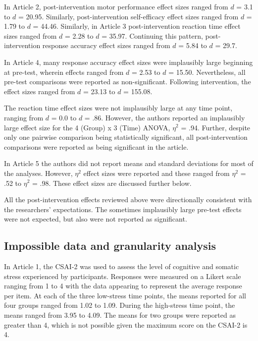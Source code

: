 \documentclass[
  english,
  man,floatsintext]{apa7}
\begin{document}
In Article 2, post-intervention motor performance effect sizes ranged from \(d\) = 3.1 to \(d\) = 20.95. Similarly, post-intervention self-efficacy effect sizes ranged from \(d\) = 1.79 to \(d\) = 44.46. Similarly, in Article 3 post-intervention reaction time effect sizes ranged from \(d\) = 2.28 to \(d\) = 35.97. Continuing this pattern, post-intervention response accuracy effect sizes ranged from \(d\) = 5.84 to \(d\) = 29.7.

In Article 4, many response accuracy effect sizes were implausibly large beginning at pre-test, wherein effects ranged from \(d\) = 2.53 to \(d\) = 15.50. Nevertheless, all pre-test comparisons were reported as non-significant. Following intervention, the effect sizes ranged from \(d\) = 23.13 to \(d\) = 155.08.

The reaction time effect sizes were not implausibly large at any time point, ranging from \(d\) = 0.0 to \(d\) = .86. However, the authors reported an implausibly large effect size for the 4 (Group) x 3 (Time) ANOVA, \(\eta^{2}\) = .94. Further, despite only one pairwise comparison being statistically significant, all post-intervention comparisons were reported as being significant in the article.

In Article 5 the authors did not report means and standard deviations for most of the analyses. However, \(\eta^{2}\) effect sizes were reported and these ranged from \(\eta^{2}\) = .52 to \(\eta^{2}\) = .98. These effect sizes are discussed further below.

All the post-intervention effects reviewed above were directionally consistent with the researchers' expectations. The sometimes implausibly large pre-test effects were not expected, but also were not reported as significant.

\hypertarget{impossible-data-and-granularity-analysis}{%
\subsection{Impossible data and granularity analysis}\label{impossible-data-and-granularity-analysis}}

In Article 1, the CSAI-2 was used to assess the level of cognitive and somatic stress experienced by participants. Responses were measured on a Likert scale ranging from 1 to 4 with the data appearing to represent the average response per item. At each of the three low-stress time points, the means reported for all four groups ranged from 1.02 to 1.09. During the high-stress time point, the means ranged from 3.95 to 4.09. The means for two groups were reported as greater than 4, which is not possible given the maximum score on the CSAI-2 is 4.
\end{document}
